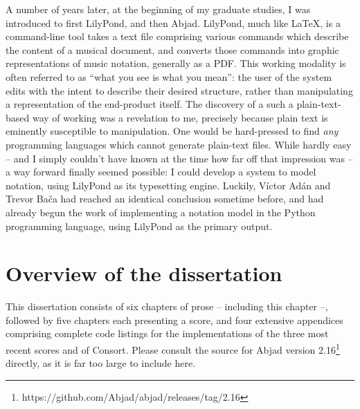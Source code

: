 

A number of years later, at the beginning of my graduate studies, I was
introduced to first LilyPond, and then Abjad. LilyPond, much like \LaTeX{},
is a command-line tool takes a text file comprising various commands which
describe the content of a musical document, and converts those commands into
graphic representations of music notation, generally as a PDF. This working
modality is often referred to as \enquote{what you see is what you mean}: the
user of the system edits with the intent to describe their desired structure,
rather than manipulating a representation of the end-product itself. The
discovery of a such a plain-text-based way of working was a revelation to me,
precisely because plain text is eminently susceptible to manipulation. One
would be hard-pressed to find \emph{any} programming languages which cannot
generate plain-text files. While hardly easy -- and I simply couldn't have
known at the time how far off that impression was -- a way forward finally
seemed possible: I could develop a system to model notation, using LilyPond as
its typesetting engine. Luckily, V\'{i}ctor Ad\'{a}n and Trevor Ba\v{c}a had
reached an identical conclusion sometime before, and had already begun the work
of implementing a notation model in the Python programming language, using
LilyPond as the primary output.

\vspace*{0.25\baselineskip}

\section{Overview of the dissertation}
\label{sec:overview-of-the-dissertation}

This dissertation consists of six chapters of prose -- including this chapter
--, followed by five chapters each presenting a score, and four extensive
appendices comprising complete code listings for the implementations of the
three most recent scores and of Consort. Please consult the source for Abjad
version 2.16\footnote{https://github.com/Abjad/abjad/releases/tag/2.16}
directly, as it is far too large to include here.

